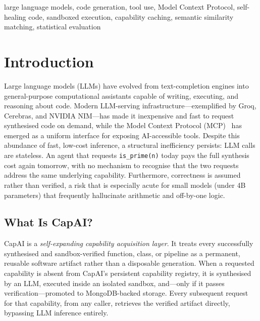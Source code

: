 \documentclass[conference]{IEEEtran}
\begin{document}
\begin{IEEEkeywords}
large language models, code generation, tool use, Model Context Protocol,
self-healing code, sandboxed execution, capability caching, semantic
similarity matching, statistical evaluation
\end{IEEEkeywords}

\section{Introduction}
\label{sec:introduction}

Large language models (LLMs) have evolved from text-completion engines
into general-purpose computational assistants capable of writing,
executing, and reasoning about code.
Modern LLM-serving infrastructure---exemplified by Groq, Cerebras, and
NVIDIA NIM---has made it inexpensive and fast to request synthesised code
on demand, while the Model Context Protocol
(MCP)~\cite{anthropic_mcp2024} has emerged as a uniform interface for
exposing AI-accessible tools.
Despite this abundance of fast, low-cost inference, a structural
inefficiency persists: LLM calls are stateless.
An agent that requests \texttt{is\_prime(n)} today pays the full
synthesis cost again tomorrow, with no mechanism to recognise that the two
requests address the same underlying capability.
Furthermore, correctness is assumed rather than verified, a risk that is
especially acute for small models (under 4B parameters) that frequently
hallucinate arithmetic and off-by-one logic.

\subsection{What Is CapAI?}

CapAI is a \emph{self-expanding capability acquisition layer}.
It treats every successfully synthesised and sandbox-verified function,
class, or pipeline as a permanent, reusable software artifact rather than
a disposable generation.
When a requested capability is absent from CapAI's persistent capability
registry, it is synthesised by an LLM, executed inside an isolated
sandbox, and---only if it passes verification---promoted to MongoDB-backed
storage.
Every subsequent request for that capability, from any caller, retrieves
the verified artifact directly, bypassing LLM inference entirely.
\end{document}

